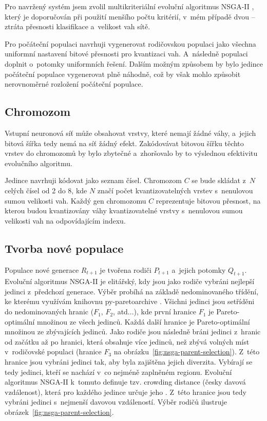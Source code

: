 Pro navržený systém jsem zvolil multikriteriální evoluční algoritmus NSGA-II \cite{996017}, který je doporučován při použití menšího počtu kritérií, v~mém případě dvou -- ztráta přesnosti klasifikace a~velikost vah sítě.

Pro počáteční populaci navrhuji vygenerovat rodičovskou populaci jako všechna uniformní nastavení bitové přesnosti pro kvantizaci vah. A~následně populaci doplnit o~potomky uniformních řešení. Dalším možným způsobem by bylo jedince počáteční populace vygenerovat plně náhodně, což by však mohlo způsobit nerovnoměrné rozložení počáteční populace.

\subsection{Chromozom}

Vstupní neuronová síť může obsahovat vrstvy, které nemají žádné váhy, a~jejich bitová šířka tedy nemá na síť žádný efekt. Zakódovávat bitovou šířku těchto vrstev do chromozomů by bylo zbytečné a~zhoršovalo by to výslednou efektivitu evolučního algoritmu. 

Jedince navrhuji kódovat jako seznam čísel. Chromozom $C$ se bude skládat z~$N$ celých čísel od 2 do 8, kde $N$ značí počet kvantizovatelných vrstev s~nenulovou sumou velikosti vah. Každý gen chromozomu $C$ reprezentuje bitovou přesnost, na kterou budou kvantizovány váhy kvantizovatelné vrstvy s~nenulovou sumou velikosti vah na odpovídajícím indexu.

\subsection{Tvorba nové populace}

Populace nové generace $R_{t+1}$ je tvořena rodiči $P_{t+1}$ a~jejich potomky $Q_{t+1}$. Evoluční algoritmus NSGA-II je elitářský, kdy jsou jako rodiče vybráni nejlepší jedinci z~předchozí generace. Výběr probíhá na základě nedominovaného třídění, ke kterému využívám knihovnu py-paretoarchive \cite{py-paretoarchive}. Všichni jedinci jsou setříděni do nedominovaných hranic ($F_1$, $F_2$, atd...), kde první hranice $F_1$ je Pareto-optimální množinou ze všech jedinců. Každá další hranice je Pareto-optimální množinou ze zbývajících jedinců. Jako rodiče jsou následně bráni jedinci z~hranic od začátku až po hranici, která obsahuje více jedinců, než zbývá volných míst v~rodičovské populaci (hranice $F_3$ na obrázku~\ref{fig:nsga-parent-selection}). Z~této hranice jsou vybráni jedinci tak, aby byla zajištěna jejich diverzita. Vybírají se tedy jedinci, kteří se nachází v~co nejméně zaplněném regionu. Evoluční algoritmus NSGA-II k~tomuto definuje tzv. crowding distance (česky davová vzdálenost), která pro každého jedince určuje jeho . Z~této hranice jsou tedy vybráni jedinci s~nejmenší davovou vzdáleností. Výběr rodičů ilustruje obrázek~\ref{fig:nsga-parent-selection}.

